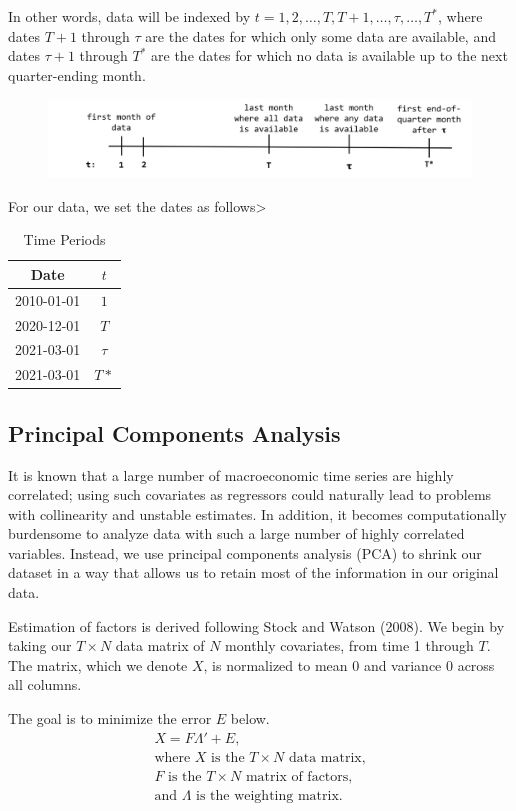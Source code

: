 \documentclass[11pt, letterpaper]{article}\usepackage[]{graphicx}\usepackage[]{color}
\begin{document}
In other words, data will be indexed by $t = 1, 2, \dots, T, T+1, \dots, \tau, \dots, T^*$, where dates $T + 1$ through $\tau$ are the dates for which only some data are available, and dates $\tau + 1$ through $T^*$ are the dates for which no data is available up to the next quarter-ending month.
\begin{figure}[H]
\includegraphics[scale=.7]{nowcast-time}
\centering
\end{figure}
For our data, we set the dates as follows>
\begin{table}[H]
\centering
\begingroup\footnotesize
\begin{tabular}{cc}
  \hline
Date & $t$ \\ 
  \hline
2010-01-01 & $1$ \\ 
  2020-12-01 & $T$ \\ 
  2021-03-01 & $\tau$ \\ 
  2021-03-01 & $T*$ \\ 
   \hline
\end{tabular}
\endgroup
\caption{Time Periods} 
\end{table}


\subsection{Principal Components Analysis}
It is known that a large number of macroeconomic time series are highly correlated; using such covariates as regressors could naturally lead to problems with collinearity and unstable estimates. In addition, it becomes computationally burdensome to analyze data with such a large number of highly correlated variables. Instead, we use principal components analysis (PCA) to shrink our dataset in a way that allows us to retain most of the information in our original data.

Estimation of factors is derived following Stock and Watson (2008). We begin by taking our $T \times N$ data matrix of $N$ monthly covariates, from time 1 through $T$. The matrix, which we denote $X$, is normalized to mean 0 and variance 0 across all columns.

The goal is to minimize the error $E$ below.
\begin{align*}
	X = F  \Lambda ' + E,\\
	\text{where $X$ is the $T \times N$ data matrix,}\\
	\text{$F$ is the $T \times N$ matrix of factors,}\\
	\text{and $\Lambda$ is the weighting matrix.}\\
\end{align*}
\end{document}
